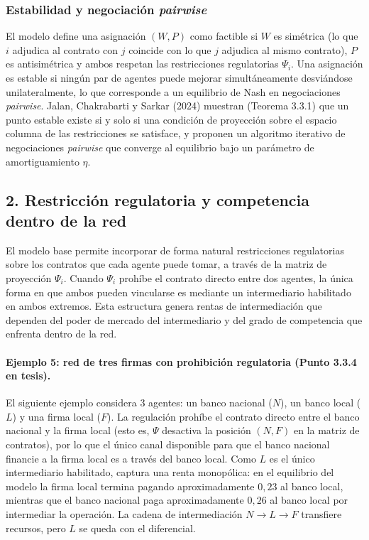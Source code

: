 \documentclass[12pt,a4paper]{article}
\begin{document}
\subsubsection*{Estabilidad y negociación \textit{pairwise}}

El modelo define una asignación $(W, P)$ como factible si $W$ es simétrica (lo que $i$
adjudica al contrato con $j$ coincide con lo que $j$ adjudica al mismo contrato), $P$ es
antisimétrica y ambos respetan las restricciones regulatorias $\Psi_i$. Una asignación es
estable si ningún par de agentes puede mejorar simultáneamente desviándose
unilateralmente, lo que corresponde a un equilibrio de Nash en negociaciones \textit{pairwise}.
Jalan, Chakrabarti y Sarkar (2024) muestran (Teorema 3.3.1) que un punto estable existe si y solo si
una condición de proyección sobre el espacio columna de las restricciones se satisface, y
proponen un algoritmo iterativo de negociaciones \textit{pairwise} que converge al equilibrio
bajo un parámetro de amortiguamiento $\eta$.

\subsection*{2. Restricción regulatoria y competencia dentro de la red}

El modelo base permite incorporar de forma natural restricciones regulatorias sobre los
contratos que cada agente puede tomar, a través de la matriz de proyección $\Psi_i$. Cuando
$\Psi_i$ prohíbe el contrato directo entre dos agentes, la única forma en que ambos pueden
vincularse es mediante un intermediario habilitado en ambos extremos. Esta estructura genera
rentas de intermediación que dependen del poder de mercado del intermediario y del grado de
competencia que enfrenta dentro de la red.

\paragraph{Ejemplo 5: red de tres firmas con prohibición regulatoria (Punto 3.3.4 en tesis).}
El siguiente ejemplo considera 3 agentes: un banco nacional ($N$), un banco local ($L$) y una
firma local ($F$). La regulación prohíbe el contrato directo entre el banco nacional y la firma
local (esto es, $\Psi$ desactiva la posición $(N, F)$ en la matriz de contratos), por lo que el
único canal disponible para que el banco nacional financie a la firma local es a través del banco
local. Como $L$ es el único intermediario habilitado, captura una renta monopólica: en el
equilibrio del modelo la firma local termina pagando aproximadamente $0{,}23$ al banco local,
mientras que el banco nacional paga aproximadamente $0{,}26$ al banco local por intermediar
la operación. La cadena de intermediación $N \to L \to F$ transfiere recursos, pero $L$ se queda
con el diferencial.
\end{document}
